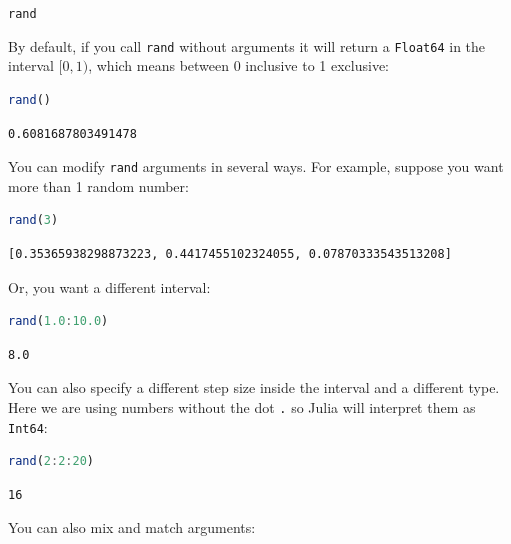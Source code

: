 \documentclass[
  notoc %
]{tufte-book}
\makeatletter
\newcommand{\passthrough}[1]{#1}
\renewcommand\subsubsection{%
\@startsection{subsubsection}{3}{\z@ }{-3.25ex\@plus -1ex \@minus -.2ex}{1.5ex \@plus .2ex}{\normalfont \normalsize \bfseries }
}
\makeatother
\begin{document}
\hypertarget{sec:random_rand}{%
\subsubsection{\texorpdfstring{\texttt{rand}}{rand}}\label{sec:random_rand}}

By default, if you call \passthrough{\lstinline!rand!} without arguments
it will return a \passthrough{\lstinline!Float64!} in the interval
\([0, 1)\), which means between 0 inclusive to 1 exclusive:

\begin{lstlisting}[language=Julia]
rand()
\end{lstlisting}

\begin{lstlisting}[language=Output]
0.6081687803491478
\end{lstlisting}

You can modify \passthrough{\lstinline!rand!} arguments in several ways.
For example, suppose you want more than 1 random number:

\begin{lstlisting}[language=Julia]
rand(3)
\end{lstlisting}

\begin{lstlisting}[language=Output]
[0.35365938298873223, 0.4417455102324055, 0.07870333543513208]
\end{lstlisting}

Or, you want a different interval:

\begin{lstlisting}[language=Julia]
rand(1.0:10.0)
\end{lstlisting}

\begin{lstlisting}[language=Output]
8.0
\end{lstlisting}

You can also specify a different step size inside the interval and a
different type. Here we are using numbers without the dot
\passthrough{\lstinline!.!} so Julia will interpret them as
\passthrough{\lstinline!Int64!}:

\begin{lstlisting}[language=Julia]
rand(2:2:20)
\end{lstlisting}

\begin{lstlisting}[language=Output]
16
\end{lstlisting}

You can also mix and match arguments:
\end{document}
